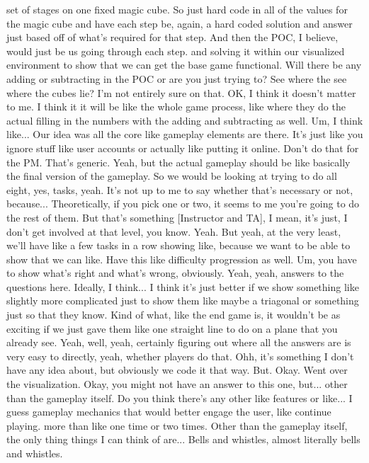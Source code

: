 \documentclass{article}
\begin{document}
set of stages on one fixed magic cube. So just hard code in all of the values for the magic cube and have each step be, again, a hard coded solution and answer just based off of what's required for that step. And then the POC, I believe, would just be us going through each step.
and solving it within our visualized environment to show that we can get the base game functional.
Will there be any adding or subtracting in the POC or are you just trying to?
See where the see where the cubes lie? I'm not entirely sure on that. OK, I think it doesn't matter to me. I think it it will be like the whole game process, like where they do the actual filling in the numbers with the adding and subtracting as well.
Um, I think like...
Our idea was all the core like gameplay elements are there. It's just like you ignore stuff like user accounts or actually like putting it online. Don't do that for the PM. That's generic. Yeah, but the actual gameplay should be like basically the final version of the gameplay.
So we would be looking at trying to do all eight, yes, tasks, yeah.
It's not up to me to say whether that's necessary or not, because...
Theoretically, if you pick one or two, it seems to me you're going to do the rest of them. But that's something [Instructor and TA], I mean, it's just, I don't get involved at that level, you know. Yeah.
But yeah, at the very least, we'll have like a few tasks in a row showing like, because we want to be able to show that we can like.
Have this like difficulty progression as well. Um, you have to show what's right and what's wrong, obviously. Yeah, yeah, answers to the questions here. Ideally, I think...
I think it's just better if we show something like slightly more complicated just to show them like maybe a triagonal or something just so that they know.
Kind of what, like the end game is, it wouldn't be as exciting if we just gave them like one straight line to do on a plane that you already see. Yeah, well, yeah, certainly figuring out where all the answers are is very easy to directly, yeah, whether players do that.
Ohh, it's something I don't have any idea about, but obviously we code it that way.
But.
Okay.
Went over the visualization.
Okay, you might not have an answer to this one, but...
other than the gameplay itself. Do you think there's any other like features or like...
I guess gameplay mechanics that would better engage the user, like continue playing.
more than like one time or two times.
Other than the gameplay itself, the only thing things I can think of are...
Bells and whistles, almost literally bells and whistles.
\end{document}
